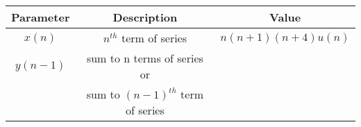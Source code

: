 \begin{tabular}{|c|c|c|}
\hline
\textbf{Parameter} & \textbf{Description} & \textbf{Value} \\
\hline
$x(n)$ & $n^{th}$ term of series & $n(n+1)(n+4)u(n)$\\
\hline
$y(n-1)$ & sum to n terms of series or & \\&sum to $(n-1)^{th}$ term of series&\\
\hline
\end{tabular}
